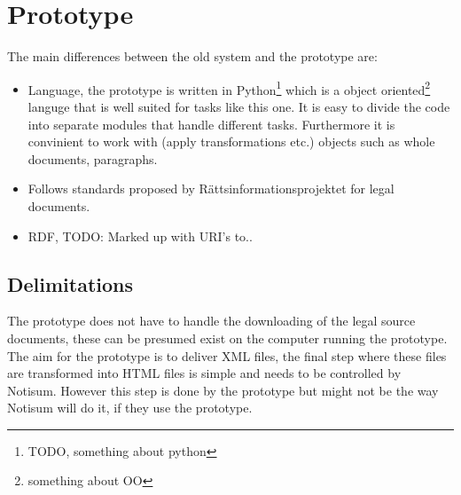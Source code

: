 \section{Prototype}
The main differences between the old system and the prototype are: 
\begin{itemize}
\item Language, the prototype is written in Python\footnote{TODO, something about python} which is a object oriented\footnote{something about OO} languge that is well suited for tasks like this one. It is easy to divide the code into separate modules that handle different tasks. Furthermore it is convinient to work with (apply transformations etc.) objects such as whole documents, paragraphs. 
\item Follows standards proposed by Rättsinformationsprojektet for legal documents.   
\item RDF, TODO: Marked up with URI's to.. 
\end{itemize} 

\subsection{Delimitations}
The prototype does not have to handle the downloading of the legal source documents, these can be presumed exist on the computer running the prototype. \\The aim for the prototype is to deliver XML files, the final step where these files are transformed into HTML files is simple and needs to be controlled by Notisum. However this step is done by the prototype but might not be the way Notisum will do it, if they use the prototype.